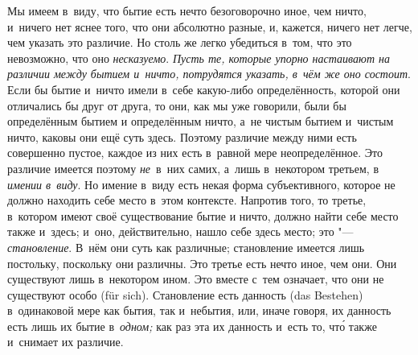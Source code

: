 Мы имеем в~виду, что бытие есть нечто безоговорочно иное, чем ничто, и~ничего
нет яснее того, что они абсолютно разные, и, кажется, ничего нет легче, чем
указать это различие. Но столь же легко убедиться в~том, что это невозможно,
что оно {\em несказуемо}. {\em Пусть те, которые упорно настаивают на
различии между бытием и~ничто, потрудятся указать, в~чём же оно состоит}. Если
бы бытие и~ничто имели в~себе какую-либо определённость, которой они отличались
бы друг от друга, то они, как мы уже говорили, были бы определённым бытием и
определённым ничто, а~не чистым бытием и~чистым ничто, каковы они ещё суть
здесь. Поэтому различие между ними есть совершенно пустое, каждое из них есть
в~равной мере неопределённое. Это различие имеется поэтому {\em не}~в~них
самих, а~лишь в~некотором третьем, в {\em имении в~виду}. Но имение в~виду есть
некая форма субъективного, которое не должно находить себе место в~этом
контексте. Напротив того, то третье, в~котором имеют своё существование бытие и
ничто, должно найти себе место также и~здесь; и~оно, действительно, нашло себе
здесь место; это "--- {\em становление}. В~нём они суть как различные;
становление имеется лишь постольку, поскольку они различны. Это третье есть
нечто иное, чем они. Они существуют лишь в~некотором ином. Это вместе с~тем
означает, что они не существуют особо (für sich). Становление есть данность
(das Bestehen) в~одинаковой мере как бытия, так и~небытия, или, иначе говоря,
их данность есть лишь их бытие в~{\em одном;} как раз эта их данность и~есть
то, чт\'{о} также и~снимает их различие.

